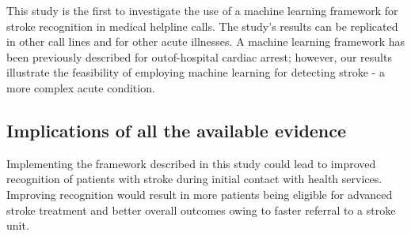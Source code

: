{This study is the first to investigate the use of a machine learning framework for stroke recognition in medical helpline calls. The study's results can be replicated in other call lines and for other acute illnesses. A machine learning framework has been previously described for outof-hospital cardiac arrest; however, our results illustrate the feasibility of employing machine learning for detecting stroke - a more complex acute condition.

\subsection{Implications of all the available evidence}

Implementing the framework described in this study could lead to improved recognition of patients with stroke during initial contact with health services. Improving recognition would result in more patients being eligible for advanced stroke treatment and better overall outcomes owing to faster referral to a stroke unit.

}
